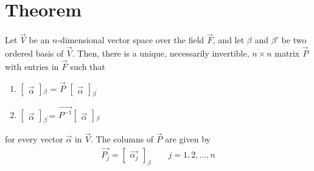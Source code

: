 \documentclass[journal,12pt,twocolumn]{IEEEtran}
\begin{document}
\section{Theorem}
\begin{theorem} \label{1}
Let $\vec{V}$ be an $n$-dimensional vector space over the field $\vec{F}$, and let $\beta$ and $\beta'$ be two ordered basis of $\vec{V}$. Then, there is a unique, necessarily invertible, $n\times n$ matrix $\vec{P}$ with entries in $\vec{F}$ such that 
\begin{enumerate}
	\item $\begin{bmatrix}
	\vec{\alpha}
	\end{bmatrix}$$_\beta$ = $\vec{P}$  $\begin{bmatrix}
	\vec{\alpha} 
\end{bmatrix}$$_{\beta^{'}}$
    \item $\begin{bmatrix}
    	\vec{\alpha}
    \end{bmatrix}$$_{\beta^{'}}$= $\vec{P^{-1}}$$\begin{bmatrix}
    \vec{\alpha}	
\end{bmatrix}$$_\beta$
\end{enumerate}
for every vector $\vec{\alpha}$ in $\vec{V}$. The columns of $\vec{P}$ are given by
\begin{align}
\vec{P_j} =  \begin{bmatrix}
	\vec{\alpha_j}
\end{bmatrix}_{\beta}	\qquad j = 1,2,...,n
\end{align}
\end{theorem}
\end{document}
